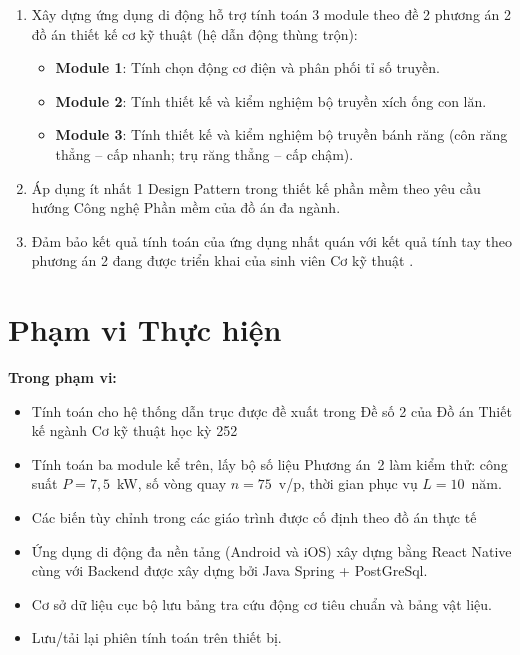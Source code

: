 \begin{enumerate}
    \item Xây dựng ứng dụng di động hỗ trợ tính toán 3 module theo đề 2 phương án 2 đồ án thiết kế cơ kỹ thuật (hệ dẫn động thùng trộn):
        \begin{itemize}
            \item \textbf{Module 1}: Tính chọn động cơ điện và phân phối tỉ số truyền.
            \item \textbf{Module 2}: Tính thiết kế và kiểm nghiệm bộ truyền xích ống con lăn.
            \item \textbf{Module 3}: Tính thiết kế và kiểm nghiệm bộ truyền bánh răng
                (côn răng thẳng -- cấp nhanh; trụ răng thẳng -- cấp chậm).
        \end{itemize}
    \item Áp dụng ít nhất 1 Design Pattern trong thiết kế phần mềm theo yêu cầu hướng Công nghệ Phần mềm của đồ án đa ngành.
    \item Đảm bảo kết quả tính toán của ứng dụng nhất quán với kết quả tính tay theo phương án 2 đang được triển khai của sinh viên Cơ kỹ thuật \cite{LeNhatTruong2026}.
\end{enumerate}

\section{Phạm vi Thực hiện}
\label{sec:intro-scope}

\textbf{Trong phạm vi:}
\begin{itemize}
    \item Tính toán cho hệ thống dẫn trục được đề xuất trong Đề số 2 của Đồ án Thiết kế ngành Cơ kỹ thuật học kỳ 252
    \item Tính toán ba module kể trên, lấy bộ số liệu Phương án~2 làm kiểm thử:
            công suất $P = 7{,}5$~kW, số vòng quay $n = 75$~v/p, thời gian phục vụ $L = 10$~năm.
    \item Các biến tùy chỉnh trong các giáo trình \cite{trinh2006tinh, Loc2023GiaoTrinh, Loc2020ThietKe} được cố định theo đồ án thực tế\cite{LeNhatTruong2026}
    \item Ứng dụng di động đa nền tảng (Android và iOS) xây dựng bằng React Native cùng với Backend được xây dựng bởi Java Spring + PostGreSql.
    \item Cơ sở dữ liệu cục bộ lưu bảng tra cứu động cơ tiêu chuẩn và bảng vật liệu.
    \item Lưu/tải lại phiên tính toán trên thiết bị.
\end{itemize}

